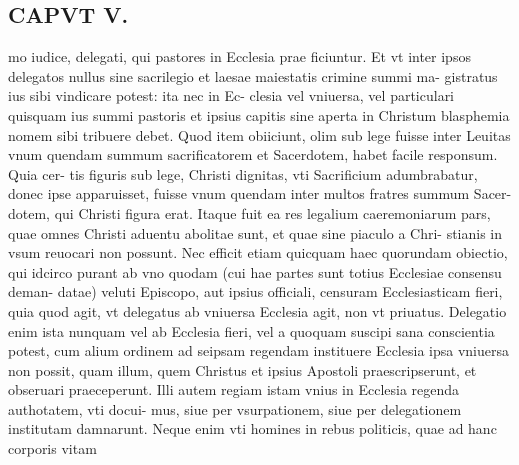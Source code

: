 \documentclass{article}
\begin{document}
\begin{pages}
\section*{CAPVT  V. }
\marginpar{[ p.243 ]}\pstart mo iudice, delegati, qui pastores in Ecclesia prae ficiuntur. Et vt inter ipsos delegatos nullus sine sacrilegio et laesae maiestatis crimine summi ma- gistratus ius sibi vindicare potest: ita nec in Ec- clesia vel vniuersa, vel particulari quisquam ius summi pastoris et ipsius capitis sine aperta in Christum blasphemia nomem sibi tribuere debet. Quod item obiiciunt, olim sub lege fuisse inter Leuitas vnum quendam summum sacrificatorem et Sacerdotem, habet facile responsum. Quia cer- tis figuris sub lege, Christi dignitas, vti Sacrificium adumbrabatur, donec ipse apparuisset, fuisse vnum quendam inter multos fratres summum Sacer- dotem, qui Christi figura erat. Itaque fuit ea res legalium caeremoniarum pars, quae omnes Christi aduentu abolitae sunt, et quae sine piaculo a Chri- stianis in vsum reuocari non possunt. Nec efficit etiam quicquam haec quorundam obiectio, qui idcirco purant ab vno quodam (cui hae partes sunt totius Ecclesiae consensu deman- datae) veluti Episcopo, aut ipsius officiali, censuram Ecclesiasticam fieri, quia quod agit, vt delegatus ab vniuersa Ecclesia agit, non vt priuatus. Delegatio enim ista nunquam vel ab Ecclesia fieri, vel a quoquam suscipi sana conscientia potest, cum alium ordinem ad seipsam regendam instituere Ecclesia ipsa vniuersa non possit, quam illum, quem Christus et ipsius Apostoli praescripserunt, et obseruari praeceperunt. Illi autem regiam istam vnius in Ecclesia regenda authotatem, vti docui- mus, siue per vsurpationem, siue per delegationem institutam damnarunt. Neque enim vti homines in rebus politicis, quae ad hanc corporis vitam  \pend

\end{pages}
\end{document}
